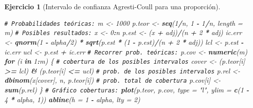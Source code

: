 \documentclass[
  spanish,
  10pt,
]{book}
\newenvironment{Shaded}{\begin{snugshade}}{\end{snugshade}}
\newcommand{\AttributeTok}[1]{\textcolor[rgb]{0.13,0.29,0.53}{#1}}
\newcommand{\CommentTok}[1]{\textcolor[rgb]{0.56,0.35,0.01}{\textit{#1}}}
\newcommand{\ControlFlowTok}[1]{\textcolor[rgb]{0.13,0.29,0.53}{\textbf{#1}}}
\newcommand{\DecValTok}[1]{\textcolor[rgb]{0.00,0.00,0.81}{#1}}
\newcommand{\FunctionTok}[1]{\textcolor[rgb]{0.13,0.29,0.53}{\textbf{#1}}}
\newcommand{\NormalTok}[1]{#1}
\newcommand{\OtherTok}[1]{\textcolor[rgb]{0.56,0.35,0.01}{#1}}
\newcommand{\SpecialCharTok}[1]{\textcolor[rgb]{0.81,0.36,0.00}{\textbf{#1}}}
\newcommand{\StringTok}[1]{\textcolor[rgb]{0.31,0.60,0.02}{#1}}
\theoremstyle{break}
\newtheorem{exercise}{Ejercicio}[chapter]
\theoremstyle{nonumberplain}
\renewcommand{\CommentTok}[1]{\textcolor[rgb]{0.41,0.41,0.41}{\texttt{#1}}}
\begin{document}
\begin{exercise}[Intervalo de confianza Agresti-Coull para una proporción]
\begin{enumerate}
\begin{Shaded}
\begin{Highlighting}[]
\CommentTok{\# Probabilidades teóricas:}
\NormalTok{m }\OtherTok{\textless{}{-}} \DecValTok{1000}
\NormalTok{p.teor }\OtherTok{\textless{}{-}} \FunctionTok{seq}\NormalTok{(}\DecValTok{1}\SpecialCharTok{/}\NormalTok{n, }\DecValTok{1} \SpecialCharTok{{-}} \DecValTok{1}\SpecialCharTok{/}\NormalTok{n, }\AttributeTok{length =}\NormalTok{ m) }
\CommentTok{\# Posibles resultados:}
\NormalTok{x }\OtherTok{\textless{}{-}} \DecValTok{0}\SpecialCharTok{:}\NormalTok{n}
\NormalTok{p.est }\OtherTok{\textless{}{-}}\NormalTok{ (x }\SpecialCharTok{+}\NormalTok{ adj)}\SpecialCharTok{/}\NormalTok{(n }\SpecialCharTok{+} \DecValTok{2} \SpecialCharTok{*}\NormalTok{ adj) }
\NormalTok{ic.err }\OtherTok{\textless{}{-}} \FunctionTok{qnorm}\NormalTok{(}\DecValTok{1} \SpecialCharTok{{-}}\NormalTok{ alpha}\SpecialCharTok{/}\DecValTok{2}\NormalTok{) }\SpecialCharTok{*} \FunctionTok{sqrt}\NormalTok{(p.est }\SpecialCharTok{*}\NormalTok{ (}\DecValTok{1} \SpecialCharTok{{-}}\NormalTok{ p.est)}\SpecialCharTok{/}\NormalTok{(n }\SpecialCharTok{+} \DecValTok{2} \SpecialCharTok{*}\NormalTok{ adj))  }
\NormalTok{lcl }\OtherTok{\textless{}{-}}\NormalTok{ p.est }\SpecialCharTok{{-}}\NormalTok{ ic.err }
\NormalTok{ucl }\OtherTok{\textless{}{-}}\NormalTok{ p.est }\SpecialCharTok{+}\NormalTok{ ic.err }
\CommentTok{\# Recorrer prob. teóricas:}
\NormalTok{p.cov }\OtherTok{\textless{}{-}} \FunctionTok{numeric}\NormalTok{(m)}
\ControlFlowTok{for}\NormalTok{ (i }\ControlFlowTok{in} \DecValTok{1}\SpecialCharTok{:}\NormalTok{m) \{}
  \CommentTok{\# cobertura de los posibles intervalos}
\NormalTok{  cover }\OtherTok{\textless{}{-}}\NormalTok{ (p.teor[i] }\SpecialCharTok{\textgreater{}=}\NormalTok{ lcl) }\SpecialCharTok{\&}\NormalTok{ (p.teor[i] }\SpecialCharTok{\textless{}=}\NormalTok{ ucl)  }
  \CommentTok{\# prob. de los posibles intervalos}
\NormalTok{  p.rel }\OtherTok{\textless{}{-}} \FunctionTok{dbinom}\NormalTok{(x[cover], n, p.teor[i])           }
  \CommentTok{\# prob. total de cobertura}
\NormalTok{  p.cov[i] }\OtherTok{\textless{}{-}} \FunctionTok{sum}\NormalTok{(p.rel)                            }
\NormalTok{\}}
\CommentTok{\# Gráfico coberturas:}
\FunctionTok{plot}\NormalTok{(p.teor, p.cov, }\AttributeTok{type =} \StringTok{"l"}\NormalTok{, }\AttributeTok{ylim =} \FunctionTok{c}\NormalTok{(}\DecValTok{1} \SpecialCharTok{{-}} \DecValTok{4} \SpecialCharTok{*}\NormalTok{ alpha, }\DecValTok{1}\NormalTok{))}
\FunctionTok{abline}\NormalTok{(}\AttributeTok{h =} \DecValTok{1} \SpecialCharTok{{-}}\NormalTok{ alpha, }\AttributeTok{lty =} \DecValTok{2}\NormalTok{) }
\end{Highlighting}
\end{Shaded}


\end{enumerate}
\end{exercise}
\end{document}
